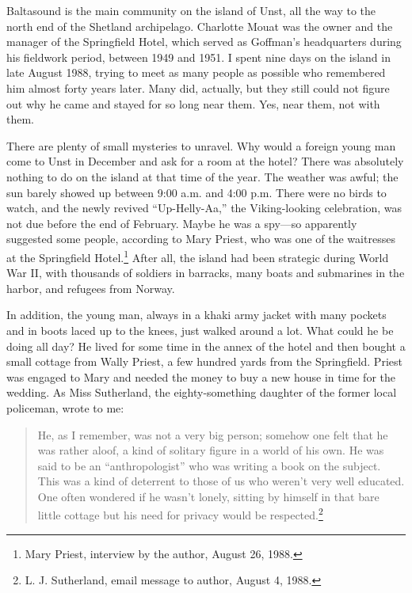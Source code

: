 \documentclass[openany,nobib]{tufte-book}
\begin{document}
Baltasound is the main community on the island of Unst, all the way to
the north end of the Shetland archipelago. Charlotte Mouat was the owner
and the manager of the Springfield Hotel, which served as Goffman's
headquarters during his fieldwork period, between 1949 and 1951. I spent
nine days on the island in late August 1988, trying to meet as many
people as possible who remembered him almost forty years later. Many
did, actually, but they still could not figure out why he came and
stayed for so long near them. Yes, near them, not with them.

There are plenty of small mysteries to unravel. Why would a foreign
young man come to Unst in December and ask for a room at the hotel?
There was absolutely nothing to do on the island at that time of the
year. The weather was awful; the sun barely showed up between 9:00 a.m.
and 4:00 p.m. There were no birds to watch, and the newly revived
``Up-Helly-Aa,'' the Viking-looking celebration, was not due before the
end of February. Maybe he was a spy---so apparently suggested some
people, according to Mary Priest, who was one of the waitresses at the
Springfield Hotel.\footnote{Mary Priest, interview by the author, August
  26, 1988.} After all, the island had been strategic during World War
II, with thousands of soldiers in barracks, many boats and submarines in
the harbor, and refugees from Norway.

In addition, the young man, always in a khaki army jacket with many
pockets and in boots laced up to the knees, just walked around a lot.
What could he be doing all day? He lived for some time in the annex of
the hotel and then bought a small cottage from Wally Priest, a few
hundred yards from the Springfield. Priest was engaged to Mary and
needed the money to buy a new house in time for the wedding. As Miss
Sutherland, the eighty-something daughter of the former local policeman,
wrote to me:

\begin{quote}
He, as I remember, was not a very big person; somehow one felt that he
was rather aloof, a kind of solitary figure in a world of his own. He
was said to be an ``anthropologist'' who was writing a book on the
subject. This was a kind of deterrent to those of us who weren't very
well educated. One often wondered if he wasn't lonely, sitting by
himself in that bare little cottage but his need for privacy would be
respected.\footnote{L. J. Sutherland, email message to author, August 4,
  1988.}
\end{quote}
\end{document}
